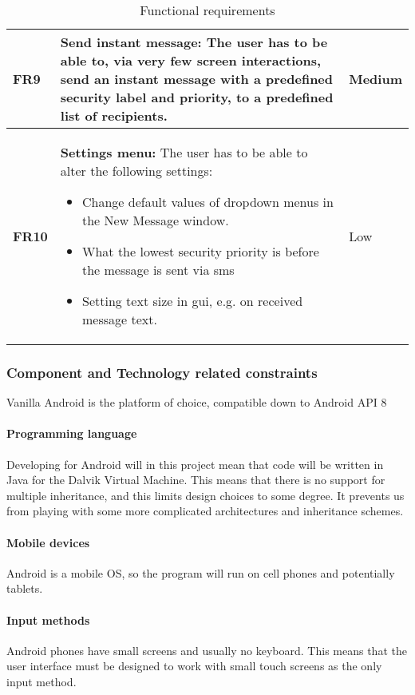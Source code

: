 \begin{table}[hbt]
\begin{center}
\begin{tabular}{p{1.5cm}|p{12.5cm}|p{2cm}}
\textbf{FR9} & \textbf{Send instant message:} The user has to be able to, via very few screen interactions, send an instant message with a predefined security label and priority, to a predefined list of recipients. & Medium \\ \hline
\textbf{FR10} & \textbf{Settings menu:} The user has to be able to alter the following settings: 
\begin{itemize}
\item{}Change default values of dropdown menus in the New Message window.
\item{}What the lowest security priority is before the message is sent via \gls{sms}
\item{}Setting text size in \gls{gui}, e.g. on received message text.
\end{itemize}  & Low \\ \hline
\end{tabular}
\end{center}
\caption{Functional requirements} \label{tab:functionalreq}
\end{table}

\subsubsection{Component and Technology related constraints}
Vanilla Android is the platform of choice, compatible down to Android API 8

\paragraph{Programming language} \hfill
\newline
Developing for Android will in this project mean that code will be written in Java for the Dalvik Virtual Machine. This means that there is no support for multiple inheritance, and this limits design choices to some degree. It prevents us from playing with some more complicated architectures and inheritance schemes.

\paragraph{Mobile devices} \hfill
\newline
Android is a mobile OS, so the program will run on cell phones and potentially tablets. 

\paragraph{Input methods} \hfill
\newline
Android phones have small screens and usually no keyboard. This means that the user interface must be designed to work with small touch screens as the only input method.

